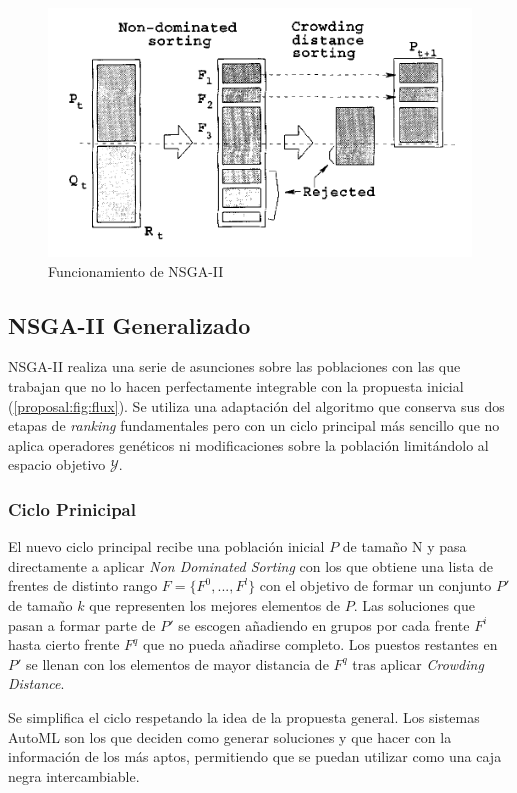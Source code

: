 \begin{figure}[ht]
    \centering
    \includegraphics[scale=0.5]{Pictures/nsga2.png}
    \caption{Funcionamiento de NSGA-II}
    \label{proposal:fig:nsga2}
\end{figure}

\subsection{NSGA-II Generalizado}

NSGA-II realiza una serie de asunciones sobre las poblaciones con las que trabajan que no lo hacen perfectamente integrable con la propuesta inicial (\ref{proposal:fig:flux}). Se utiliza una adaptaci\'on del algoritmo que conserva sus dos etapas de \textit{ranking} fundamentales pero con un ciclo principal m\'as sencillo que no aplica operadores gen\'eticos ni modificaciones sobre la poblaci\'on limit\'andolo al espacio objetivo $\mathcal{Y}$.

\subsubsection{Ciclo Prinicipal}
El nuevo ciclo principal recibe una poblaci\'on inicial $P$ de tama\~no N y pasa directamente a aplicar \textit{Non Dominated Sorting} con los que obtiene una lista de frentes de distinto rango $F = \{F^0, ..., F^l\}$ con el objetivo de formar un conjunto $P'$ de tama\~no $k$ que representen los mejores elementos de $P$. Las soluciones que pasan a formar parte de $P'$ se escogen a\~nadiendo en grupos por cada frente $F^i$ hasta cierto frente $F^q$ que no pueda a\~nadirse completo. Los puestos restantes en $P'$ se llenan con los elementos de mayor distancia de $F^q$ tras aplicar \textit{Crowding Distance}.

Se simplifica el ciclo respetando la idea de la propuesta general.  Los sistemas AutoML son los que deciden como generar soluciones y que hacer con la informaci\'on de los m\'as aptos, permitiendo que se puedan utilizar como una caja negra intercambiable.
